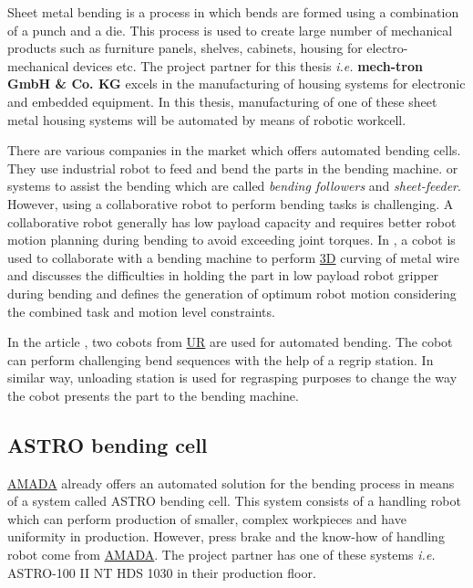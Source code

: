 Sheet metal bending is a process in which bends are formed using a combination of a punch and a die. This process is used to create large number of mechanical products such as furniture panels, shelves, cabinets, housing for electro-mechanical devices etc. \cite{alvaautomated}
The project partner for this thesis \textit{i.e.} \textbf{mech-tron GmbH \& Co. KG} excels in the manufacturing of housing systems for electronic and embedded equipment. In this thesis, manufacturing of one of these sheet metal housing systems will be automated by means of robotic workcell.


There are various companies in the market which offers automated bending cells. They use industrial robot to feed and bend the parts in the bending machine. \cite{mekoprint, shenchong, shopmetal} or systems to assist the bending which are called \textit{bending followers} and \textit{sheet-feeder}. \cite{guimaraes2009bending} However, using a collaborative robot to perform bending tasks is challenging. A collaborative robot generally has low payload capacity and requires better robot motion planning during bending to avoid exceeding joint torques.
In \cite{liu2022metalwiremanipulationplanning}, a cobot is used to collaborate with a bending machine to perform \hyperref[acro:3D]{3D} curving of metal wire and discusses the difficulties in holding the
part in low payload robot gripper during bending and defines the generation of optimum robot motion considering the combined task and motion level constraints.

In the article \cite{cobotfabricator}, two cobots from \hyperref[acro:UR]{UR} are used for automated bending. The cobot can perform challenging bend sequences with the help of a regrip station. In similar way, unloading station is used for regrasping purposes to change the way the cobot presents the part to the bending machine.

\subsection{ASTRO bending cell}
\label{subsec:astro}

\hyperref[acro:AMADA]{AMADA} already offers an automated solution for the bending process in means of a system called ASTRO bending cell. This system consists of a handling robot which can perform production of smaller, complex workpieces and have uniformity in production. However, press brake and the know-how of handling robot come from \hyperref[acro:AMADA]{AMADA}.
The project partner has one of these systems \textit{i.e.} ASTRO-100 II NT HDS 1030 in their production floor. 

